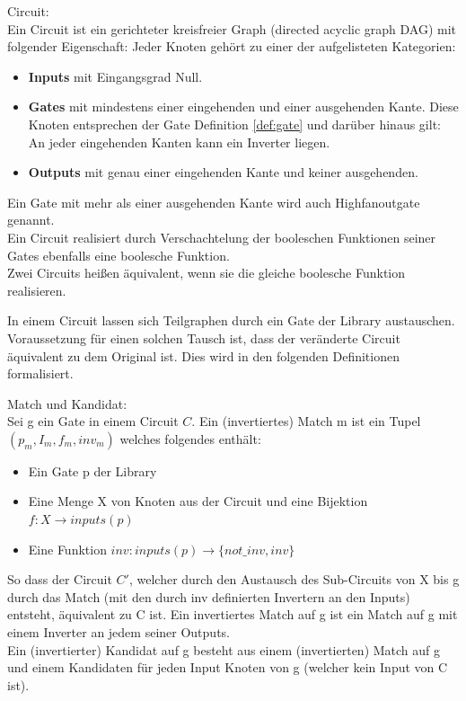 \documentclass[11pt, a4paper, german]{article}
\begin{document}
\begin{definition}{Circuit:}\\
Ein Circuit ist ein gerichteter kreisfreier Graph (directed acyclic graph DAG) mit folgender Eigenschaft: Jeder Knoten gehört zu einer der aufgelisteten Kategorien: 
\begin{itemize}
\item {\bf Inputs }mit Eingangsgrad Null.
\item{\bf Gates} mit mindestens einer eingehenden und einer ausgehenden Kante.
Diese Knoten entsprechen der Gate Definition \ref{def:gate} und darüber hinaus gilt: An jeder eingehenden Kanten kann ein Inverter liegen.
\item{\bf Outputs} mit genau einer eingehenden Kante und keiner ausgehenden.
\end{itemize}
Ein Gate mit mehr als einer ausgehenden Kante wird auch Highfanoutgate genannt.\\
Ein Circuit realisiert durch Verschachtelung der booleschen Funktionen seiner Gates ebenfalls eine boolesche Funktion. \\
Zwei Circuits heißen äquivalent, wenn sie die gleiche boolesche Funktion realisieren.
\end{definition}

In einem Circuit lassen sich Teilgraphen durch ein Gate der Library austauschen. Voraussetzung für einen solchen Tausch ist, dass der veränderte Circuit äquivalent zu dem Original ist. Dies wird in den folgenden Definitionen formalisiert. 

\begin{definition}{Match und Kandidat:}\\
Sei g ein Gate in einem Circuit $C$. Ein (invertiertes) Match m ist ein Tupel $(p_m, I_m, f_m, inv_m)$ welches folgendes enthält:
\begin{itemize}
\item Ein Gate p der Library
\item Eine Menge X von Knoten aus der Circuit und eine Bijektion $ f: X \rightarrow inputs(p)$
\item Eine Funktion $ inv : inputs(p) \rightarrow \{not\_inv , inv \}$
\end{itemize}
So dass der Circuit $C'$, welcher durch den Austausch des Sub-Circuits von X bis g durch das Match (mit den durch inv definierten Invertern an den Inputs) entsteht, äquivalent zu C ist.
Ein invertiertes Match auf g ist ein Match auf g mit einem Inverter an jedem seiner Outputs.\\
Ein (invertierter) Kandidat auf g besteht aus einem (invertierten) Match auf g und einem Kandidaten für jeden Input Knoten von g (welcher kein Input von C ist).
\end{definition}
\end{document}
